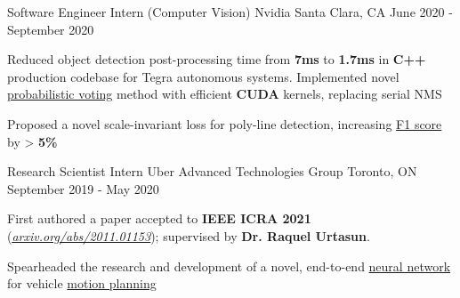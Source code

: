 \begin{cventries}
  \cventry
    {Software Engineer Intern (Computer Vision)} %
    {Nvidia} %
    {Santa Clara, CA} %
    {June 2020 - September 2020} %
    {
      \begin{cvitems} %
        \item {Reduced object detection post-processing time from \textbf{7ms}
        to \textbf{1.7ms} in \textbf{C++} production codebase for Tegra
        autonomous systems. Implemented novel \underline{probabilistic voting}
        method with efficient \textbf{CUDA} kernels, replacing serial NMS}
        \item {Proposed a novel scale-invariant loss for poly-line detection, increasing \underline{F1 score} by > \textbf{5\%}}
      \end{cvitems}
    }

  \cventry
    {Research Scientist Intern} %
    {Uber Advanced Technologies Group} %
    {Toronto, ON} %
    {September 2019 - May 2020} %
    {
      \begin{cvitems} %
        \item {First authored a paper accepted to \textbf{IEEE ICRA 2021}} (\href{https://arxiv.org/pdf/2011.01153.pdf}{\underline{\textit{arxiv.org/abs/2011.01153}}});
        supervised by \textbf{Dr. Raquel Urtasun}.
        \item {Spearheaded the research and development of a novel, end-to-end
        \underline{neural network} for vehicle \underline{motion planning}}
      \end{cvitems}
    }


\end{cventries}
